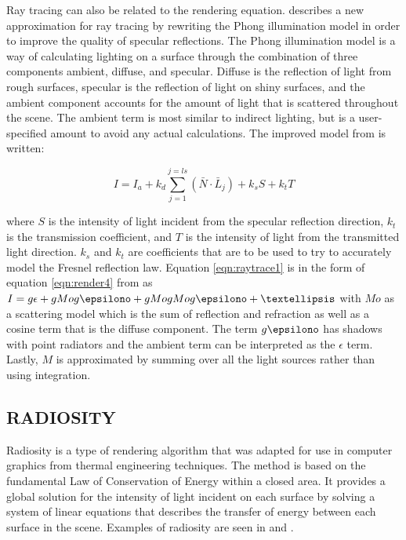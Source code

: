 Ray tracing can also be related to the rendering equation.  \cite{Whitted1980} describes a new approximation for ray tracing by rewriting the Phong illumination model in order to improve the quality of specular reflections.  The Phong illumination model is a way of calculating lighting on a surface through the combination of three components ambient, diffuse, and specular.  Diffuse is the reflection of light from rough surfaces, specular is the reflection of light on shiny surfaces, and the ambient component accounts for the amount of light that is scattered throughout the scene.  The ambient term is most similar to indirect lighting, but is a user-specified amount to avoid any actual calculations.  The improved model from \cite{Whitted1980} is written:

\begin{equation}
I = I_{a} + k_{d}\sum_{j=1}^{j=ls}(\bar{N}\cdot\bar{L}_{j})+k_{s}S + k_{t}T \label{eqn:raytrace1}
\end{equation}

where $S$ is the intensity of light incident from the specular reflection direction, $k_{t}$ is the transmission coefficient, and $T$ is the intensity of light from the transmitted light direction. $k_{s}$ and $k_{t}$ are coefficients that are to be used to try to accurately model the Fresnel reflection law.  Equation \ref{eqn:raytrace1} is in the form of equation \ref{eqn:render4} from \cite{Kajiya1986} as $I =  g\epsilon +gMog\epsilono +gMogMog\epsilono + … $ with $Mo$ as a scattering model which is the sum of reflection and refraction as well as a cosine term that is the diffuse component. The term $g\epsilono$ has shadows with point radiators and the ambient term can be interpreted as the $\epsilon$ term.  Lastly, $M$ is approximated by summing over all the light sources rather than using integration.

\subsection{RADIOSITY}

Radiosity is a type of rendering algorithm that was adapted for use in computer graphics from thermal engineering techniques.  The method is based on the fundamental Law of Conservation of Energy within a closed area.  It provides a global solution for the intensity of light incident on each surface by solving a system of linear equations that describes the transfer of energy between each surface in the scene.  Examples of radiosity are seen in \cite{Immel1986} and \cite{Goral}.

